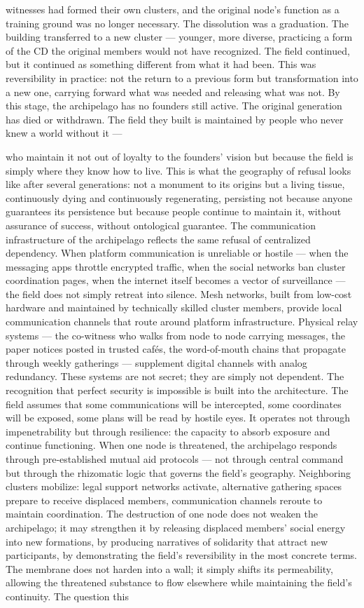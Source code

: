 witnesses had formed their own clusters, and the original node’s function as a training ground was no longer necessary. The dissolution was a graduation. The building transferred to a new cluster — younger, more diverse, practicing a form of the CD the original members would not have recognized. The field continued, but it continued as something different from what it had been. This was reversibility in practice: not the return to a previous form but transformation into a new one, carrying forward what was needed and releasing what was not. By this stage, the archipelago has no founders still active. The original generation has died or withdrawn. The field they built is maintained by people who never knew a world without it —

who maintain it not out of loyalty to the founders’ vision but because the field is simply where they know how to live. This is what the geography of refusal looks like after several generations: not a monument to its origins but a living tissue, continuously dying and continuously regenerating, persisting not because anyone guarantees its persistence but because people continue to maintain it, without assurance of success, without ontological guarantee. The communication infrastructure of the archipelago reflects the same refusal of centralized dependency. When platform communication is unreliable or hostile — when the messaging apps throttle encrypted traffic, when the social networks ban cluster coordination pages, when the internet itself becomes a vector of surveillance — the field does not simply retreat into silence. Mesh networks, built from low-cost hardware and maintained by technically skilled cluster members, provide local communication channels that route around platform infrastructure. Physical relay systems — the co-witness who walks from node to node carrying messages, the paper notices posted in trusted cafés, the word-of-mouth chains that propagate through weekly gatherings — supplement digital channels with analog redundancy. These systems are not secret; they are simply not dependent. The recognition that perfect security is impossible is built into the architecture. The field assumes that some communications will be intercepted, some coordinates will be exposed, some plans will be read by hostile eyes. It operates not through impenetrability but through resilience: the capacity to absorb exposure and continue functioning. When one node is threatened, the archipelago responds through pre-established mutual aid protocols — not through central command but through the rhizomatic logic that governs the field’s geography. Neighboring clusters mobilize: legal support networks activate, alternative gathering spaces prepare to receive displaced members, communication channels reroute to maintain coordination. The destruction of one node does not weaken the archipelago; it may strengthen it by releasing displaced members’ social energy into new formations, by producing narratives of solidarity that attract new participants, by demonstrating the field’s reversibility in the most concrete terms. The membrane does not harden into a wall; it simply shifts its permeability, allowing the threatened substance to flow elsewhere while maintaining the field’s continuity. The question this 